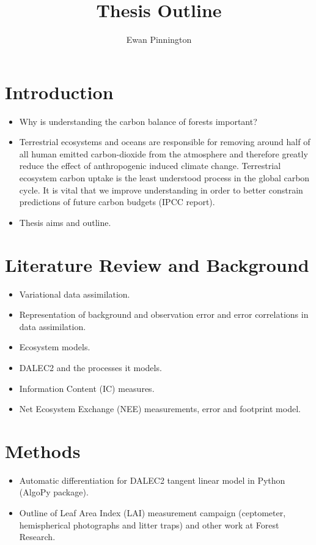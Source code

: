 \documentclass[11pt]{article}
\title{Thesis Outline}
\author{Ewan Pinnington}
\begin{document}
\maketitle

\section{Introduction}
\begin{itemize}
\item Why is understanding the carbon balance of forests important?
\item Terrestrial ecosystems and oceans are responsible for removing around half of all human emitted carbon-dioxide from the atmosphere and therefore greatly reduce the effect of anthropogenic induced climate change. Terrestrial ecosystem carbon uptake is the least understood process in the global carbon cycle. It is vital that we improve understanding in order to better constrain predictions of future carbon budgets (IPCC report).
\item Thesis aims and outline.
\end{itemize}


\section{Literature Review and Background}
\begin{itemize}
\item Variational data assimilation.
\item Representation of background and observation error and error correlations in data assimilation.
\item Ecosystem models.
\item DALEC2 and the processes it models.
\item Information Content (IC) measures.
\item Net Ecosystem Exchange (NEE) measurements, error and footprint model.
\end{itemize}


\section{Methods}
\begin{itemize}
\item Automatic differentiation for DALEC2 tangent linear model in Python (AlgoPy package).
\item Outline of Leaf Area Index (LAI) measurement campaign (ceptometer, hemispherical photographs and litter traps) and other work at Forest Research.
\end{itemize}
\end{document}
